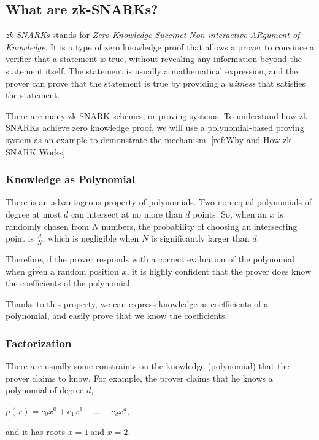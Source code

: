 \documentclass[
]{report}
\begin{document}
\subsection{What are zk-SNARKs?}

\emph{zk-SNARKs} stands for \emph{Zero Knowledge Succinct
Non-interactive ARgument of Knowledge}. It is a type of zero knowledge
proof that allows a prover to convince a verifier that a statement is
true, without revealing any information beyond the statement itself. The
statement is usually a mathematical expression, and the prover can prove
that the statement is true by providing a \emph{witness} that satisfies
the statement.

There are many zk-SNARK schemes, or proving systems. To understand how
zk-SNARKs achieve zero knowledge proof, we will use a polynomial-based
proving system as an example to demonstrate the mechanism.
{[}ref:Why and How zk-SNARK Works{]}

\subsubsection{Knowledge as Polynomial}

There is an advantageous property of polynomials. Two non-equal
polynomials of degree at most \(d\) can intersect at no more than \(d\)
points. So, when an \(x\) is randomly chosen from \(N\) numbers, the
probability of choosing an intersecting point is \(\frac{d}{N}\), which
is negligible when \(N\) is significantly larger than \(d\).

Therefore, if the prover responds with a correct evaluation of the
polynomial when given a random position \(x\), it is highly confident
that the prover does know the coefficients of the polynomial.

Thanks to this property, we can express knowledge as coefficients of a
polynomial, and easily prove that we know the coefficients.

\subsubsection{Factorization}

There are usually some constraints on the knowledge (polynomial) that
the prover claims to know. For example, the prover claims that he knows
a polynomial of degree \(d\),

\(p(x) = c_{0}x^{0} + c_{1}x^{1} + \ldots + c_{d}x^{d}\),

and it has roots \(x = 1\ \)and \(x = 2\).
\end{document}
